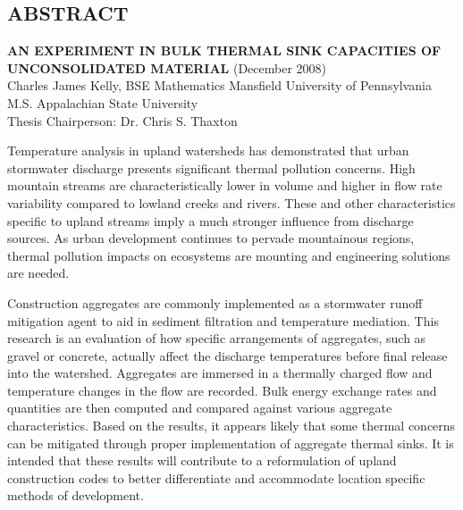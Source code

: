

\doublespacing
\begin{center}
\vspace{11mm}
\section{ABSTRACT}
\textbf{AN EXPERIMENT IN BULK THERMAL SINK CAPACITIES OF UNCONSOLIDATED MATERIAL}
(December 2008)\\
\vspace{6mm}Charles James Kelly, BSE Mathematics Mansfield University of Pennsylvania\\
M.S. Appalachian State University\\
Thesis Chairperson: Dr. Chris S. Thaxton\vspace{3mm}
\end{center}

Temperature analysis in upland watersheds has demonstrated that urban stormwater discharge presents significant thermal pollution concerns. High mountain streams are characteristically lower in volume and higher in flow rate variability compared to lowland creeks and rivers. These and other characteristics specific to upland streams imply a much stronger influence from discharge sources. As urban development continues to pervade mountainous regions, thermal pollution impacts on ecosystems are mounting and engineering solutions are needed. 

Construction aggregates are commonly implemented as a stormwater runoff mitigation agent to aid in sediment filtration and temperature mediation. This research is an evaluation of how specific arrangements of aggregates, such as gravel or concrete, actually affect the discharge temperatures before final release into the watershed. Aggregates are immersed in a thermally charged flow and temperature changes in the flow are recorded. Bulk energy exchange rates and quantities are then computed and compared against various aggregate characteristics. Based on the results, it appears likely that some thermal concerns can be mitigated through proper implementation of aggregate thermal sinks. It is intended that these results will contribute to a reformulation of upland construction codes to better differentiate and accommodate location specific methods of development.
